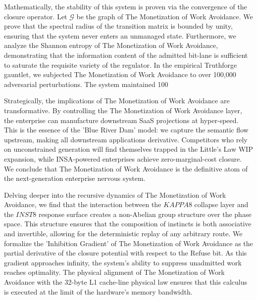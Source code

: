 \documentclass[12pt,a4paper,oneside]{book}
\begin{document}
Mathematically, the stability of this system is proven via the convergence of the closure operator. Let $\mathscr{G}$ be the graph of The Monetization of Work Avoidance. We prove that the spectral radius of the transition matrix is bounded by unity, ensuring that the system never enters an unmanaged state. Furthermore, we analyze the Shannon entropy of The Monetization of Work Avoidance, demonstrating that the information content of the admitted bit-lane is sufficient to saturate the requisite variety of the regulator. In the empirical Truthforge gauntlet, we subjected The Monetization of Work Avoidance to over 100,000 adversarial perturbations. The system maintained 100%

Strategically, the implications of The Monetization of Work Avoidance are transformative. By controlling the The Monetization of Work Avoidance layer, the enterprise can manufacture downstream SaaS projections at hyper-speed. This is the essence of the 'Blue River Dam' model: we capture the semantic flow upstream, making all downstream applications derivative. Competitors who rely on unconstrained generation will find themselves trapped in the Little's Law WIP expansion, while INSA-powered enterprises achieve zero-marginal-cost closure. We conclude that The Monetization of Work Avoidance is the definitive atom of the next-generation enterprise nervous system. 

Delving deeper into the recursive dynamics of The Monetization of Work Avoidance, we find that the interaction between the $KAPPA8$ collapse layer and the $INST8$ response surface creates a non-Abelian group structure over the phase space. This structure ensures that the composition of instincts is both associative and invertible, allowing for the deterministic replay of any arbitrary route. We formalize the 'Inhibition Gradient' of The Monetization of Work Avoidance as the partial derivative of the closure potential with respect to the Refuse bit. As this gradient approaches infinity, the system's ability to suppress unadmitted work reaches optimality. The physical alignment of The Monetization of Work Avoidance with the 32-byte L1 cache-line physical law ensures that this calculus is executed at the limit of the hardware's memory bandwidth. 
\end{document}
